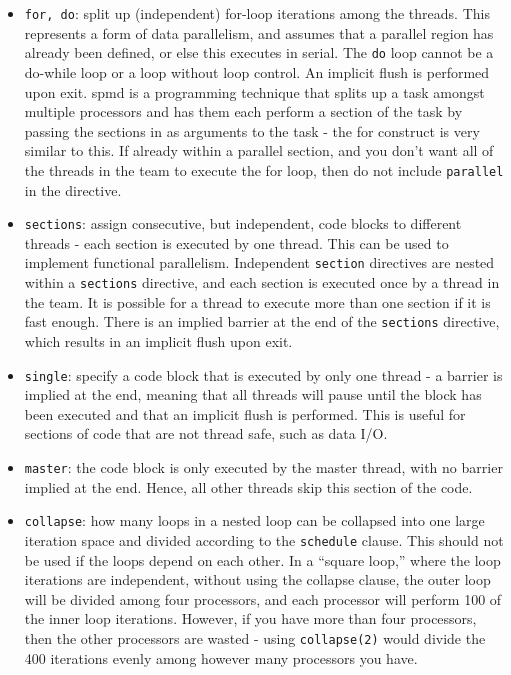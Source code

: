\documentclass[10pt]{article}
\begin{document}
\begin{flushleft}
\begin{itemize}
\item {\tt for, do}: split up (independent) for-loop iterations among the threads. This represents a form of data parallelism, and assumes that a parallel region has already been defined, or else this executes in serial. The {\tt do} loop cannot be a do-while loop or a loop without loop control. An implicit flush is performed upon exit. \gls{spmd} is a programming technique that splits up a task amongst multiple processors and has them each perform a section of the task by passing the sections in as arguments to the task - the for construct is very similar to this. If already within a parallel section, and you don't want all of the threads in the team to execute the for loop, then do not include {\tt parallel} in the directive.
\item {\tt sections}: assign consecutive, but independent, code blocks to different threads - each section is executed by one thread. This can be used to implement functional parallelism. Independent {\tt section} directives are nested within a {\tt sections} directive, and each section is executed once by a thread in the team. It is possible for a thread to execute more than one section if it is fast enough. There is an implied barrier at the end of the {\tt sections} directive, which results in an implicit flush upon exit.
\item {\tt single}: specify a code block that is executed by only one thread - a barrier is implied at the end, meaning that all threads will pause until the block has been executed and that an implicit flush is performed. This is useful for sections of code that are not thread safe, such as data I/O. 
\item {\tt master}: the code block is only executed by the master thread, with no barrier implied at the end. Hence, all other threads skip this section of the code.
\item {\tt collapse}: how many loops in a nested loop can be collapsed into one large iteration space and divided according to the {\tt schedule} clause. This should not be used if the loops depend on each other. In a ``square loop,'' where the loop iterations are independent, without using the collapse clause, the outer loop will be divided among four processors, and each processor will perform 100 of the inner loop iterations. However, if you have more than four processors, then the other processors are wasted - using {\tt collapse(2)} would divide the 400 iterations evenly among however many processors you have.


\end{itemize}
\end{flushleft}
\end{document}
